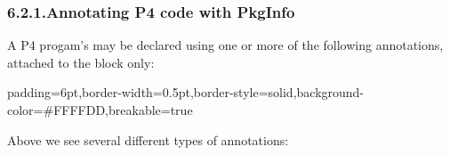\documentclass[11pt]{article}
\begin{document}
{%
\subsubsection{6.2.1.\hspace*{0.5em}Annotating P4 code with PkgInfo}\label{sec-annotating-p4-code-with-pkginfo}%

\noindent{}A P4 progam's  may be declared using one or more of the following
annotations, attached to the  block only:%

\begin{mdbmargintb}{6pt}{6pt}%
\begin{mdblock}{padding=6pt,border-width=0.5pt,border-style=solid,background-color=\#FFFFDD,breakable=true}%
\begin{mdpre}%
\end{mdpre}%
\end{mdblock}%
\end{mdbmargintb}%

\noindent{}Above we see several different types of annotations:%

\begin{itemize}%


\end{itemize}}
\end{document}
